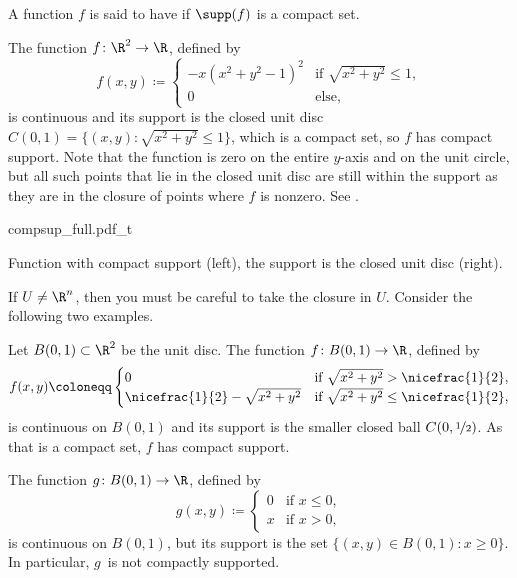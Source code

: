 A function $f$ is said to have \emph{}
if $\supp(f)$ is a compact set.

\begin{example}
The function $f \colon \R^2 \to \R$, defined by
\begin{equation*}
f(x,y) \coloneqq
\begin{cases}
-x{(x^2+y^2-1)}^2 & \text{if } \sqrt{x^2+y^2} \leq 1, \\
0                 & \text{else},
\end{cases}
\end{equation*}
is continuous and its support is the closed unit disc
$C(0,1) = \bigl\{ (x,y) : \sqrt{x^2 + y^2} \leq 1 \bigr\}$, which is a compact set, so $f$ has compact support.
Note that the function is zero on the entire $y$-axis
and on the unit circle, but
all such points that lie in the closed unit disc are still within the support
as they are in the closure of points where $f$ is nonzero.
See .
\begin{myfigureht}
{compsup_full.pdf_t}
\caption{Function with compact support (left), the support
is the closed unit disc (right).\label{fig:compsup}}
\end{myfigureht}
\end{example}

If $U \not= \R^n$, then you must be careful to
take the closure in $U$.  Consider the following
two examples.

\begin{example}
Let 
$B(0,1) \subset \R^2$ be the unit disc.  The function
$f \colon B(0,1) \to \R$, defined by
\begin{equation*}
f(x,y) \coloneqq
\begin{cases}
0                                & \text{if } \sqrt{x^2+y^2} > \nicefrac{1}{2}, \\
\nicefrac{1}{2} - \sqrt{x^2+y^2} & \text{if } \sqrt{x^2+y^2} \leq \nicefrac{1}{2},
\end{cases}
\end{equation*}
is continuous on $B(0,1)$ and its support is the smaller closed ball
$C(0,\nicefrac{1}{2})$.  As that is a compact set, $f$ has compact support.

The function $g \colon B(0,1) \to \R$, defined by
\begin{equation*}
g(x,y) \coloneqq
\begin{cases}
0 & \text{if } x \leq 0, \\
x & \text{if } x > 0,
\end{cases}
\end{equation*}
is continuous on $B(0,1)$, but its support is the set
$\bigl\{ (x,y) \in B(0,1) : x \geq 0 \bigr\}$.  In particular, $g$~is not compactly
supported.
\end{example}

